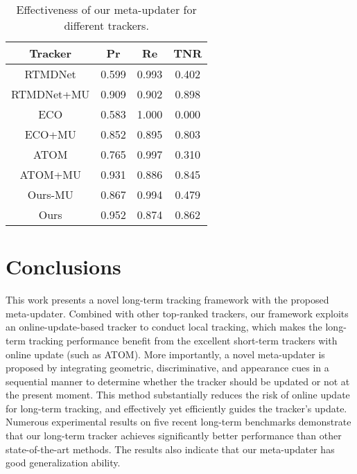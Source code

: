 \documentclass[10pt,twocolumn,letterpaper]{article}
\begin{document}
\begin{table}[h]
\vspace{-1mm}
\caption{Effectiveness of our meta-updater for different trackers. }
\vspace{-3mm}
\small
\label{tab:update_acc}
\begin{center}
\begin{tabular}{cccc}
\hline
Tracker       			& Pr       & Re             & TNR                 \\ \hline
RTMDNet       		& 0.599  & 0.993        &0.402                            \\
RTMDNet+MU   & 0.909  & 0.902        &0.898                           \\ \hline
ECO           			& 0.583  & 1.000       &0.000                           \\
ECO+MU           & 0.852   & 0.895        &0.803                            \\ \hline
ATOM          	   & 0.765   & 0.997        &0.310                           \\
ATOM+MU        & 0.931   & 0.886        &0.845                           \\ \hline
Ours-MU 		   & 0.867   & 0.994        &0.479                            \\
Ours          		   & 0.952   & 0.874  	    &0.862							  \\ \hline
\end{tabular}
\end{center}
\vspace{-6mm}
\end{table}

\vspace{-3mm}
\section{Conclusions}
\vspace{-2mm}
This work presents a novel long-term tracking framework with the proposed
meta-updater.
Combined with other top-ranked trackers, our framework exploits
an online-update-based tracker to conduct local tracking, which makes the
long-term tracking performance benefit from the excellent short-term
trackers with online update (such as ATOM).
More importantly, a novel meta-updater is proposed by integrating
geometric, discriminative, and appearance cues in a sequential manner
to determine whether the tracker should be updated or not at the present moment.
This method substantially reduces the risk of online update for long-term tracking,
and effectively yet efficiently guides the tracker's update.
Numerous experimental results on five recent long-term benchmarks
demonstrate that our long-term tracker achieves significantly better performance
than other state-of-the-art methods.
The results also indicate that our meta-updater has good
generalization ability.
\end{document}
